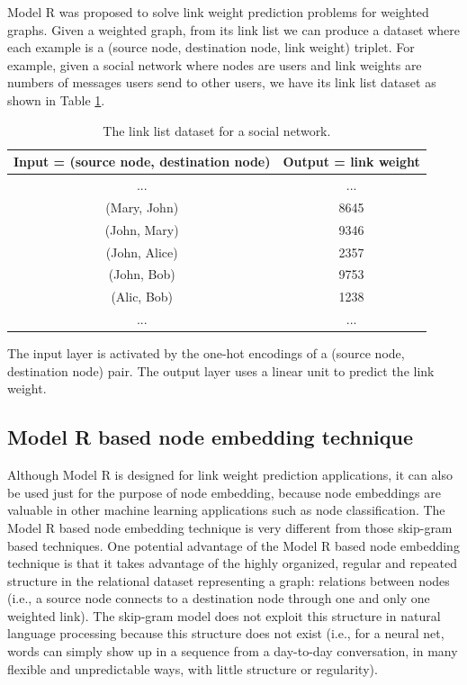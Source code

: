 \documentclass[conference]{IEEEtran}
\begin{document}
Model R was proposed to solve link weight prediction problems for weighted graphs.
Given a weighted graph, from its link list we can produce a dataset where each example is a (source node, destination node, link weight) triplet.
For example, given a social network where nodes are users and link weights are numbers of messages users send to other users, we have its link list dataset as shown in Table \ref{tab:link-list-dataset}.
\begin{table}[!ht]
	\centering
	\caption{The link list dataset for a social network.}
	\begin{tabular}{cc}  \hline \rowcolor{blue!30}
		Input = (source node, destination node) & Output = link weight \\ \hline
		...                        & ... \\ \hline
		(Mary, John) & 8645 \\ \hline
		(John, Mary) & 9346 \\ \hline
		(John, Alice) & 2357 \\ \hline
		(John, Bob) & 9753 \\ \hline
		(Alic, Bob) & 1238 \\ \hline
		...                        & ... \\ \hline
	\end{tabular}
	\label{tab:link-list-dataset}
\end{table}
The input layer is activated by the one-hot encodings of a (source node, destination node) pair. The output layer uses a linear unit to predict the link weight.

\subsection{Model R based node embedding technique}
Although Model R is designed for link weight prediction applications,
it can also be used just for the purpose of node embedding, because node embeddings are valuable in other machine learning applications such as node classification.
The Model R based node embedding technique is very different from those skip-gram based techniques.
One potential advantage of the Model R based node embedding technique is that it takes advantage of the highly organized, regular and repeated structure in the relational dataset representing a graph: 
relations between nodes (i.e., a source node connects to a destination node through one and only one weighted link).
The skip-gram model does not exploit this structure in natural language processing because this structure does not exist (i.e., for a neural net, words can simply show up in a sequence from a day-to-day conversation, in many flexible and unpredictable ways, with little structure or regularity).
\end{document}
